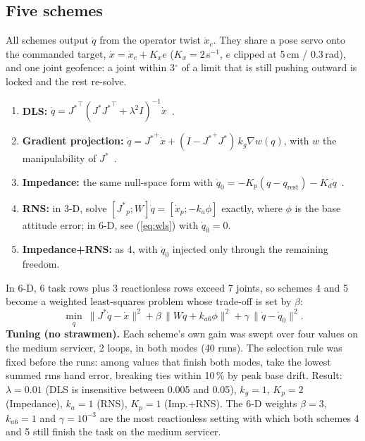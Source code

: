 \documentclass[conference]{IEEEtran}
\newcommand{\qd}{\dot{q}}
\newcommand{\Js}{{J^{*}}}
\begin{document}
\subsection{Five schemes}\label{sec:schemes}
All schemes output $\qd$ from the operator twist $\dot x_c$. They share a pose servo onto the commanded
target, $\dot x = \dot x_c + K_x e$ ($K_x = 2$\,s$^{-1}$, $e$ clipped at 5\,cm / 0.3\,rad), and one joint
geofence: a joint within 3$^\circ$ of a limit that is still pushing outward is locked and the rest re-solve.
\begin{enumerate}
\item \textbf{DLS:} $\qd = \Js^{\!\top}(\Js\Js^{\!\top}+\lambda^2 I)^{-1}\dot x$~\cite{wampler1986}.
\item \textbf{Gradient projection:} $\qd = \Js^{+}\dot x + (I-\Js^{+}\Js)\,k_g\nabla w(q)$, with $w$ the
manipulability of $\Js$~\cite{liegeois1977,yoshikawa1985}.
\item \textbf{Impedance:} the same null-space form with $\qd_0 = -K_p(q-q_{\text{rest}}) - K_d\qd$~\cite{hogan1985}.
\item \textbf{RNS:} in 3-D, solve $[\Js_{p}; W]\qd = [\dot x_p; -k_a\phi]$ exactly, where $\phi$ is the base
attitude error; in 6-D, see (\ref{eq:wls}) with $\qd_0 = 0$.
\item \textbf{Impedance+RNS:} as 4, with $\qd_0$ injected only through the remaining freedom.
\end{enumerate}
In 6-D, 6 task rows plus 3 reactionless rows exceed 7 joints, so schemes 4 and 5 become a weighted
least-squares problem whose trade-off is set by $\beta$:
\begin{equation}\label{eq:wls}
\min_{\qd}\ \|\Js\qd-\dot x\|^2 + \beta\,\|W\qd + k_{a6}\phi\|^2 + \gamma\,\|\qd-\qd_0\|^2 .
\end{equation}
\textbf{Tuning (no strawmen).} Each scheme's own gain was swept over four values on the medium servicer,
2 loops, in both modes (40 runs). The selection rule was fixed before the runs: among values that finish both
modes, take the lowest summed rms hand error, breaking ties within 10\,\% by peak base drift. Result:
$\lambda=0.01$ (DLS is insensitive between 0.005 and 0.05), $k_g=1$, $K_p=2$ (Impedance), $k_a=1$ (RNS),
$K_p=1$ (Imp.+RNS). The 6-D weights $\beta=3$, $k_{a6}=1$ and $\gamma=10^{-3}$ are the most reactionless
setting with which both schemes 4 and 5 still finish the task on the medium servicer.
\end{document}
